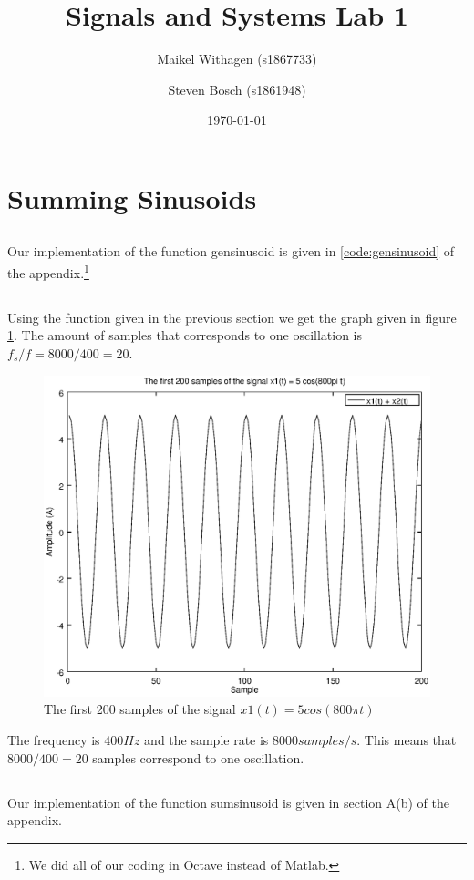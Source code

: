 \documentclass{article}
\title{Signals and Systems Lab 1}
\author{Maikel Withagen (s1867733) \and Steven Bosch (s1861948)}
\date{\today}
\begin{document}
\maketitle

\section{Summing Sinusoids}
\subsection{}
Our implementation of the function gensinusoid is given in \ref{code:gensinusoid} of the appendix.\footnote{We did all of our coding in Octave instead of Matlab.}

\subsection{}
Using the function given in the previous section we get the graph given in figure \ref{fig1b}.
The amount of samples that corresponds to one oscillation is $f_s/f=8000/400=20$.
\begin{figure}[H]
  \centering
  \includegraphics[width=.7\columnwidth]{plot1A.eps}
  \caption{The first 200 samples of the signal $x1(t) = 5cos(800\pi t)$}
  \label{fig1b}
\end{figure}
The frequency is $400Hz$ and the sample rate is $8000 samples/s$. This means that $8000/400=20$ samples correspond to one oscillation.

\subsection{}
Our implementation of the function sumsinusoid is given in section A(b) of the appendix.
\end{document}
